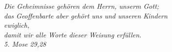 \vspace*{\fill}
\begin{center}
\begin{Large}
\textit{Die Geheimnisse gehören dem Herrn, unserm Gott;}\\
\textit{das Geoffenbarte aber gehört uns und unseren Kindern}\\
\textit{ewiglich,}\\
\textit{damit wir alle Worte dieser Weisung erfüllen.}\\
\vspace{10px}
\textit{5. Mose 29,28}
\end{Large}
\end{center}
\vspace*{\fill}